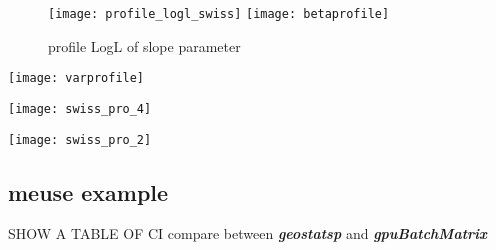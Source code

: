 \documentclass{article}\usepackage[]{graphicx}\usepackage[]{color}
\newenvironment{knitrout}{}{} %
\newcommand{\pkg}[1]{\textbf{\emph{#1}}}
\begin{document}
\begin{knitrout}
\color{fgcolor}\begin{figure}[H]

{\centering \texttt{[image: profile\_logl\_swiss]} 
\texttt{[image: betaprofile]} 

}

\caption[profile LogL of slope parameter]{profile LogL of slope parameter}\label{fig:swiss_profile_many}
\end{figure}

\end{knitrout}

\begin{knitrout}
\color{fgcolor}

{\centering \texttt{[image: varprofile]} 

}




{\centering \texttt{[image: swiss\_pro\_4]} 

}




{\centering \texttt{[image: swiss\_pro\_2]} 

}


\end{knitrout}






\subsection{meuse example}


SHOW A TABLE OF CI compare between \pkg{geostatsp} and \pkg{gpuBatchMatrix}
\end{document}
